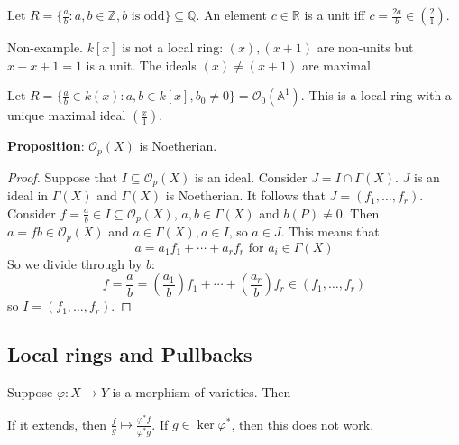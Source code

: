 \documentclass{report}
\begin{document}
\begin{examples}
    \begin{example}
        Let $R = \{\frac{a}{b} : a, b \in \mathbb{Z}, b \text{ is odd}\} \subseteq \mathbb{Q}$. An element $c \in \mathbb{R}$ is a unit iff $c = \frac{2a}{b} \in (\frac{2}{1})$.
    \end{example}
    \begin{example}
        Non-example. $k[x]$ is not a local ring: $(x), (x + 1)$ are non-units but $x - x + 1 = 1$ is a unit. The ideals $(x) \neq (x + 1)$ are maximal.
    \end{example}
    \begin{example}
        Let $R = \{\frac{a}{b} \in k(x) : a, b \in k[x], b_{0} \neq 0\} = \mathcal{O}_{0}(\mathbb{A}^{1})$. This is a local ring with a unique maximal ideal $(\frac{x}{1})$.
    \end{example}
\end{examples}

\textbf{Proposition}: $\mathcal{O}_{p}(X)$ is Noetherian.
    \begin{proof}
        Suppose that $I \subseteq \mathcal{O}_{p}(X)$ is an ideal. Consider $J = I \cap \Gamma(X)$. $J$ is an ideal in $\Gamma(X)$ and $\Gamma(X)$ is Noetherian. It follows that $J = (f_{1}, \ldots , f_{r})$. Consider $f = \frac{a}{b} \in I \subseteq \mathcal{O}_{p}(X)$, $a, b \in \Gamma(X)$ and $b(P) \neq 0$. Then $a = fb \in \mathcal{O}_{p}(X)$ and $a \in \Gamma(X), a \in I$, so $a \in J$. This means that 
            \begin{equation*}
                a = a_{1}f_{1} + \cdots +a_{r}f_{r} \text{ for $a_{i} \in \Gamma(X)$}
            \end{equation*}
        So we divide through by $b$:
            \begin{equation*}
                f = \dfrac{a}{b} = \left(\dfrac{a_{1}}{b}\right)f_{1} + \cdots  + \left(\dfrac{a_{r}}{b}\right)f_{r} \in (f_{1}, \ldots , f_{r})
            \end{equation*}
        so $I = (f_{1}, \ldots , f_{r})$.
    \end{proof}

\begin{topic}
    \section{Local rings and Pullbacks}
\end{topic}

Suppose $\varphi : X \rightarrow Y$ is a morphism of varieties. Then 
    \begin{center}
    \end{center}
If it extends, then $\frac{f}{g} \mapsto \frac{\varphi^{*}f}{\varphi^{*}g}$. If $g \in \ker{\varphi^{*}}$, then this does not work.
\end{document}

